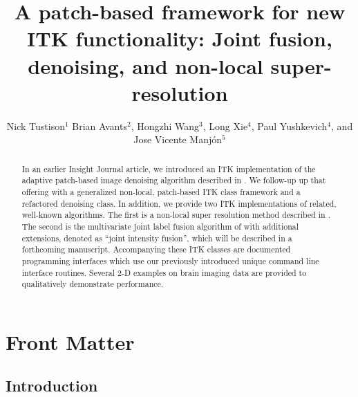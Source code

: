 \documentclass{InsightArticle}
\title{A patch-based framework for new ITK functionality:  Joint fusion, denoising,
and non-local super-resolution}
\author{Nick Tustison$^{1}$ Brian Avants$^{2}$, Hongzhi Wang$^{3}$, Long Xie$^{4}$, Paul Yushkevich$^{4}$, and Jose Vicente Manj\'on$^{5}$}
\newcommand{\IJhandlerIDnumber}{}
\begin{document}
%
%
\IJhandlefooter{\IJhandlerIDnumber}




\maketitle


\ifhtml
\chapter*{Front Matter\label{front}}
\fi


\begin{abstract}
\noindent
In an earlier Insight Journal article, we introduced an ITK implementation of the
adaptive patch-based image denoising algorithm described in \cite{Manjon:2010aa}.
We follow-up up that offering with a generalized non-local, patch-based ITK class
framework and a refactored denoising class.  In addition, we provide two
ITK implementations of related, well-known algorithms.  The first is a non-local
super resolution method described in \cite{Manjon:2010ab,Manjon:2010ac}.  The second is
the multivariate
joint label fusion algorithm of \cite{Wang:2013ab,Wang:2013aa} with additional extensions,
denoted as ``joint intensity fusion'', which will be described in a forthcoming manuscript.
Accompanying these ITK classes are
documented programming interfaces which use our previously introduced unique
command line interface routines.  Several 2-D examples on brain imaging data are
provided to qualitatively demonstrate performance.
\end{abstract}

\IJhandlenote{\IJhandlerIDnumber}


\section{Introduction}
\end{document}
